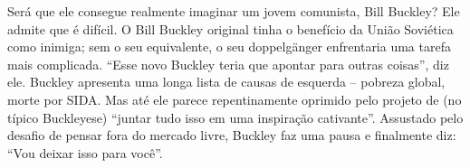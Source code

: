  \par 
Será que ele consegue realmente imaginar um jovem comunista, Bill Buckley? Ele admite que é difícil. O Bill Buckley original tinha o benefício da União Soviética como inimiga; sem o seu equivalente, o seu doppelgänger enfrentaria uma tarefa mais complicada. “Esse novo Buckley teria que apontar para outras coisas”, diz ele. Buckley apresenta uma longa lista de causas de esquerda – pobreza global, morte por SIDA. Mas até ele parece repentinamente oprimido pelo projeto de (no típico Buckleyese) “juntar tudo isso em uma inspiração cativante”. Assustado pelo desafio de pensar fora do mercado livre, Buckley faz uma pausa e finalmente diz: “Vou deixar isso para você”.